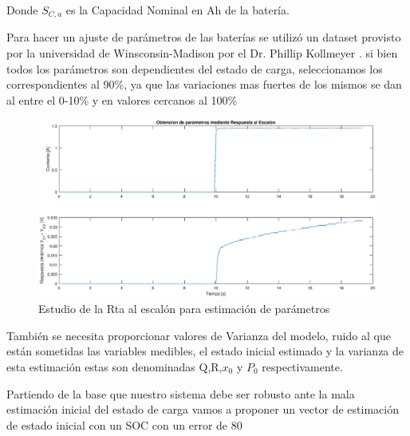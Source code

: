 \documentclass[10pt,a4paper]{article}
\begin{document}
	
	
	
	Donde $S_{C,a}$ es la Capacidad Nominal en Ah de la batería. 
	
	
	
	\clearpage
	Para hacer un ajuste de parámetros de las baterías se utilizó un dataset provisto por la universidad de Winsconsin-Madison por el Dr. Phillip Kollmeyer \cite{Kollmeyer2018}. si bien todos los parámetros son dependientes del estado de carga, seleccionamos los correspondientes al 90\%, ya que las variaciones mas fuertes de los mismos se dan al entre el 0-10\% y en valores cercanos al 100\%
	
	
	\begin{figure}[h!]
		\begin{center}
			\includegraphics[width=1\textwidth]{rta_escalon.eps}
			\caption{Estudio de la Rta al escalón para estimación de parámetros}
			\label{rta_escalon}
		\end{center}
	\end{figure}
	
	También se necesita proporcionar valores de Varianza del modelo, ruido al que están sometidas las variables medibles, el estado inicial estimado y la varianza de esta estimación estas son denominadas Q,R,$x_0$ y $P_0$ respectivamente.
	
	Partiendo de la base que nuestro sistema debe ser robusto ante la mala estimación inicial del estado de carga  vamos a proponer un vector de estimación de estado inicial con un SOC con un error de 80%
	
\end{document}
